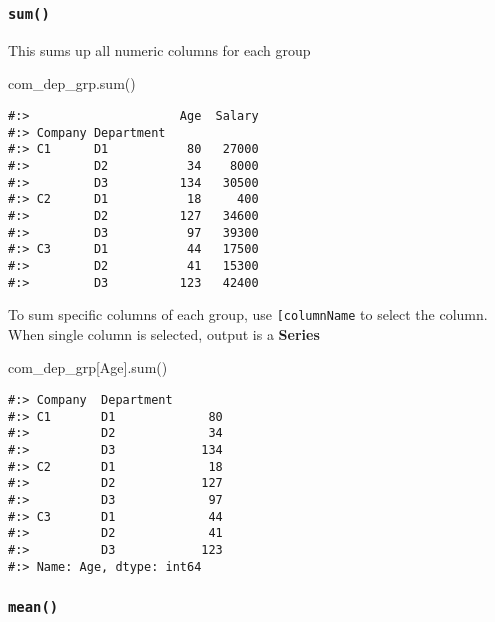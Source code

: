 \documentclass[
]{book}
\newenvironment{Shaded}{\begin{snugshade}}{\end{snugshade}}
\newcommand{\BuiltInTok}[1]{#1}
\newcommand{\NormalTok}[1]{#1}
\newcommand{\StringTok}[1]{\textcolor[rgb]{0.5,0.5,0.5}{#1}}
\begin{document}
\hypertarget{sum}{%
\subsubsection{\texorpdfstring{\texttt{sum()}}{sum()}}\label{sum}}

This sums up all numeric columns for each group

\begin{Shaded}
\begin{Highlighting}[]
\NormalTok{com\_dep\_grp.}\BuiltInTok{sum}\NormalTok{()}
\end{Highlighting}
\end{Shaded}

\begin{verbatim}
#:>                     Age  Salary
#:> Company Department             
#:> C1      D1           80   27000
#:>         D2           34    8000
#:>         D3          134   30500
#:> C2      D1           18     400
#:>         D2          127   34600
#:>         D3           97   39300
#:> C3      D1           44   17500
#:>         D2           41   15300
#:>         D3          123   42400
\end{verbatim}

To sum specific columns of each group, use \texttt{{[}\textquotesingle{}columnName\textquotesingle{}{]}} to select the column.\\
When single column is selected, output is a \textbf{Series}

\begin{Shaded}
\begin{Highlighting}[]
\NormalTok{com\_dep\_grp[}\StringTok{\textquotesingle{}Age\textquotesingle{}}\NormalTok{].}\BuiltInTok{sum}\NormalTok{()}
\end{Highlighting}
\end{Shaded}

\begin{verbatim}
#:> Company  Department
#:> C1       D1             80
#:>          D2             34
#:>          D3            134
#:> C2       D1             18
#:>          D2            127
#:>          D3             97
#:> C3       D1             44
#:>          D2             41
#:>          D3            123
#:> Name: Age, dtype: int64
\end{verbatim}

\hypertarget{mean}{%
\subsubsection{\texorpdfstring{\texttt{mean()}}{mean()}}\label{mean}}
\end{document}
